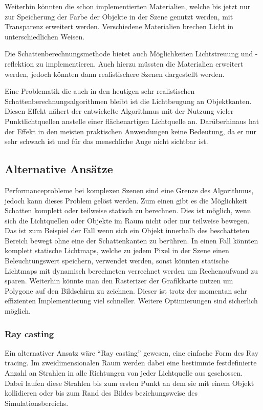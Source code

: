 Weiterhin könnten die schon implementierten Materialien, welche bis jetzt nur zur Speicherung der
Farbe der Objekte in der Szene genutzt werden, mit Transparenz erweitert werden. Verschiedene
Materialien brechen Licht in unterschiedlichen Weisen.

Die Schattenberechnungsmethode bietet auch Möglichkeiten Lichtstreuung und -reflektion zu
implementieren. Auch hierzu müssten die Materialien erweitert werden, jedoch könnten dann
realistischere Szenen dargestellt werden.

Eine Problematik die auch in den heutigen sehr realistischen Schattenberechnungsalgorithmen bleibt
ist die Lichtbeugung an Objektkanten. Diesen Effekt nähert der entwickelte Algorithmus mit der
Nutzung vieler Punktlichtquellen anstelle einer flächenartigen Lichtquelle an. Darüberhinaus hat
der Effekt in den meisten praktischen Anwendungen keine Bedeutung, da er nur sehr schwach ist und
für das menschliche Auge nicht sichtbar ist.

\subsection{Alternative Ansätze}

Performanceprobleme bei komplexen Szenen sind eine Grenze des Algorithmus, jedoch kann dieses Problem
gelöst werden. Zum einen gibt es die Möglichkeit Schatten komplett oder teilweise statisch zu berechnen.
Dies ist möglich, wenn sich die Lichtquellen oder Objekte im Raum nicht oder nur teilweise bewegen. Das
ist zum Beispiel der Fall wenn sich ein Objekt innerhalb des beschatteten Bereich bewegt ohne eine der
Schattenkanten zu berühren.
In einen Fall könnten komplett statische Lichtmaps, welche zu jedem Pixel in der Szene einen
Beleuchtungswert speichern, verwendet werden, sonst könnten statische Lichtmaps mit dynamisch berechneten
verrechnet werden um Rechenaufwand zu sparen. Weiterhin könnte man den Rasterizer der Grafikkarte nutzen
um Polygone auf den Bildschirm zu zeichnen. Dieser ist trotz der momentan sehr effizienten Implementierung
viel schneller. Weitere Optimierungen sind sicherlich möglich.

\subsubsection*{Ray casting}

Ein alternativer Ansatz wäre "`Ray casting"' gewesen, eine einfache Form des Ray tracing. Im zweidimensionalen
Raum werden dabei eine bestimmte festdefinierte Anzahl an Strahlen in alle Richtungen von jeder Lichtquelle
aus geschossen. Dabei laufen diese Strahlen bis zum ersten Punkt an dem sie mit einem Objekt kollidieren
oder bis zum Rand des Bildes beziehungsweise des Simulationsbereichs.

